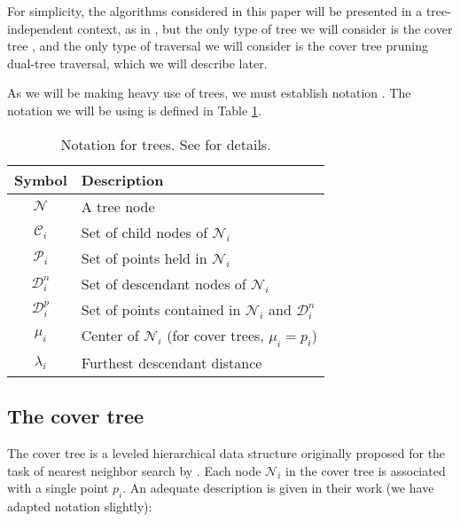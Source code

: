 For simplicity, the algorithms considered in this paper will be presented in a
tree-independent context, as in \citet{curtin2013tree}, but the only type of
tree we will consider is the cover tree \citep{langford2006}, and the only type
of traversal we will consider is the cover tree pruning dual-tree traversal,
which we will describe later.

As we will be making heavy use of trees, we must establish notation \citep[taken
from][]{curtin2013tree}.  The notation we will be using is defined in Table
\ref{tab:notation}.

\begin{table}
{\small
\begin{center}
\begin{tabular}{|c|l|}
\hline
{\bf Symbol} & {\bf Description} \\ \hline
$\mathscr{N}$ & A tree node \\ \hline
$\mathscr{C}_i$ & Set of child nodes of $\mathscr{N}_i$ \\ \hline
$\mathscr{P}_i$ & Set of points held in $\mathscr{N}_i$ \\ \hline
$\mathscr{D}_i^n$ & Set of descendant nodes of $\mathscr{N}_i$ \\ \hline
$\mathscr{D}_i^p$ & Set of points contained in $\mathscr{N}_i$ and
$\mathscr{D}_i^n$ \\ \hline
$\mu_i$ & Center of $\mathscr{N}_i$ (for cover trees, $\mu_i = p_i$) \\ \hline
$\lambda_i$ & Furthest descendant distance \\ \hline
\end{tabular}
\end{center}
}
\caption{Notation for trees.  See \cite{curtin2013tree} for details.}
\label{tab:notation}
\end{table}

\subsection{The cover tree}

The cover tree is a leveled hierarchical data structure originally proposed for
the task of nearest neighbor search by \citet{langford2006}.  Each node
$\mathscr{N}_i$ in the cover tree is associated with a single point $p_i$.  An
adequate description is given in their work (we have adapted notation slightly):

